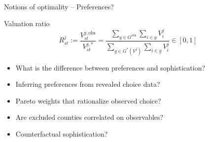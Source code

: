 \documentclass[aspectratio=169, 11pt]{beamer}
\begin{document}
\begin{frame}{Notions of optimality -- Preferences?}
  \begin{block}{Valuation ratio}
    \begin{equation*}
      R^{j}_{st} := \frac{V^{j,\mathrm{obs}}_{st}}{V^{j,*}_{st}}
      = \frac{\sum_{g \in G^{\mathrm{obs}}} \sum_{i \in g} V^j_i}{\sum_{g \in G^{*}(V^j)} \sum_{i \in g} V^j_i} \in [0,1]
    \end{equation*}
    \begin{itemize}
      \item What is the difference between preferences and sophistication?
      \item Inferring preferences from revealed choice data?
      \item Pareto weights that rationalize observed choice?
      \item Are excluded counties correlated on observables?
      \item Counterfactual sophistication?
    \end{itemize}
  \end{block}
\end{frame}

\end{document}
